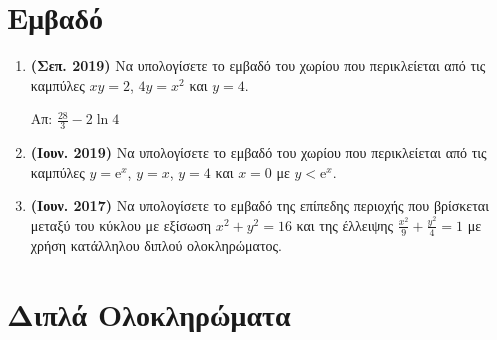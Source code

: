 


\pagestyle{askhseis}

\renewcommand{\vec}{\mathbf}



\begin{center}
  \minibox{\large \bfseries \textcolor{Col1}{θέματα στo Διπλό Ολοκλήρωμα}}
\end{center}

\vspace{\baselineskip}

\section*{Εμβαδό}

\begin{enumerate}
  \item \textbf{(Σεπ. 2019)} Να υπολογίσετε το εμβαδό του χωρίου που περικλείεται από 
    τις καμπύλες $ xy=2 $, $ 4y=x^2 $ και $ y=4 $.

    \hfill Απ: $ \frac{28}{3} - 2 \ln{4} $

  \item \textbf{(Ιουν. 2019)} Να υπολογίσετε το εμβαδό του χωρίου που περικλείεται από 
    τις καμπύλες $ y= \mathrm{e}^{x} $, $ y=x $, $ y=4 $ και $ x=0 $ με $ y<
    \mathrm{e}^{x} $. 


  \item \textbf{(Ιουν. 2017)} Να υπολογίσετε το εμβαδό της επίπεδης περιοχής που 
    βρίσκεται μεταξύ του κύκλου με εξίσωση $ x^{2}+y^{2}=16 $ και της έλλειψης 
    $ \frac{x^{2}}{9} + \frac{y^{2}}{4} =1 $ με χρήση κατάλληλου διπλού ολοκληρώματος.

\end{enumerate}


\section*{Διπλά Ολοκληρώματα}

